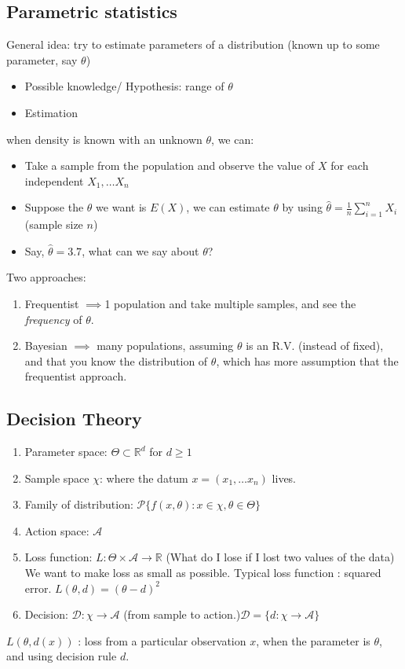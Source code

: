 \documentclass[12pt]{report} \addtolength{\textheight}{2in}
\newcommand{\Realnum}{\mathbb{R}}
\newcommand{\action}{\mathscr{A}}
\newcommand{\dec}{\mathscr{D}}
\begin{document}
\subsection*{Parametric statistics}
General idea: try to estimate parameters of a distribution (known up to some parameter, say $\theta$)
\begin{itemize}
\item Possible knowledge/ Hypothesis: range of $\theta$
\item Estimation
\end{itemize}
when density is known with an unknown $\theta$, we can:
\begin{itemize}
\item Take a sample from the population and observe the value of $X$ for each independent $X_1,\dots X_n$
\item Suppose the $\theta$ we want is $E(X)$, we can estimate $\theta$ by using $\hat{\theta}=\frac{1}{n}\sum_{i=1}^{n}X_i$ (sample size $n$)
\item Say, $\hat{\theta}=3.7$, what can we say about $\theta$?
\end{itemize}
Two approaches:
\begin{enumerate}
\item Frequentist $\implies$1 population and take multiple samples, and see the \textit{frequency} of $\theta.$
\item Bayesian $\implies$ many populations, assuming $\theta$ is an R.V. (instead of fixed), and that you know the distribution of $\theta$, which has more assumption that the frequentist approach.
\end{enumerate}
\subsection*{Decision Theory}
\begin{enumerate}[1)]
\item Parameter space: $\Theta \subset \Realnum^{d}$ for $d \geq 1$
\item Sample space $\chi$: where the datum $x=(x_1,\dots x_n)$ lives.
\item Family of distribution: $\mathscr{P}\{f(x,\theta): x\in \chi, \theta \in \Theta \}$
\item Action space: $\mathscr{A}$
\item Loss function: $L: \Theta \times \action \to \Realnum$  (What do I lose if I lost two values of the data) We want to make loss as small as possible. Typical loss function : squared error. $L(\theta, d)=(\theta-d)^2$
\item Decision: $\dec: \chi \to \action$ (from sample to action.)$\dec=\{d: \chi \to \action\}$
\end{enumerate} 
$L(\theta, d(x))$ : loss from a particular observation $x$, when the parameter is $\theta$, and using decision rule $d.$
\end{document}
